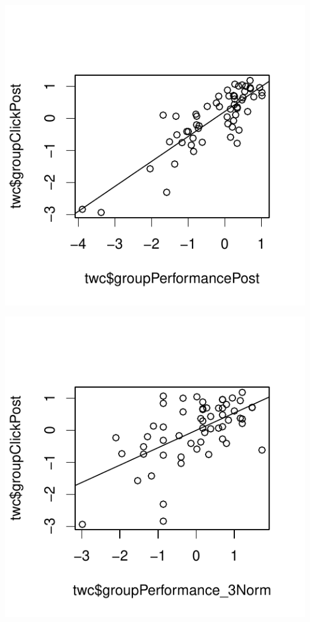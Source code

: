 \documentclass[english]{article}\usepackage[]{graphicx}\usepackage[]{color}
\makeatletter
\def\maxwidth{ %
  \ifdim\Gin@nat@width>\linewidth
    \linewidth
  \else
    \Gin@nat@width
  \fi
}
\newenvironment{knitrout}{}{} %
\makeatother
\begin{document}
\begin{knitrout}
\color{fgcolor}

{\centering \includegraphics[width=\maxwidth]{figure/predictionsTest-1} 

}




{\centering \includegraphics[width=\maxwidth]{figure/predictionsTest-2} 

}
\end{knitrout}
\end{document}
